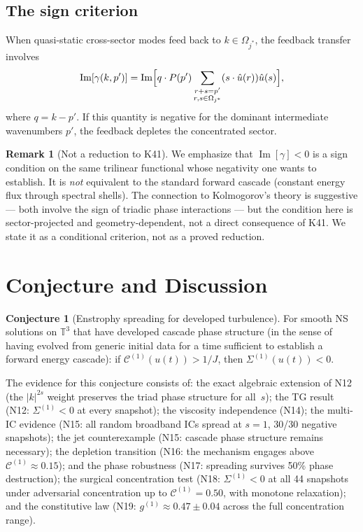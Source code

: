 \documentclass[11pt]{article}
\theoremstyle{definition}
\newtheorem{remark}[theorem]{Remark}
\newtheorem{conjecture}[theorem]{Conjecture}
\newcommand{\T}{\mathbb{T}}
\newcommand{\cC}{\mathcal{C}}
\DeclareMathOperator{\im}{Im}
\begin{document}
\subsection{The sign criterion}

When quasi-static cross-sector modes feed back to
$k\in\Omega_{j^*}$, the feedback transfer involves
\begin{equation}
\im[\gamma(k,p')] = \im\Bigl[q\cdot P(p')
\sum_{\substack{r+s=p'\\r,s\in\Omega_{j^*}}}
(s\cdot\hat u(r))\hat u(s)\Bigr],
\end{equation}
where $q=k-p'$.  If this quantity is negative for
the dominant intermediate wavenumbers $p'$, the feedback
depletes the concentrated sector.

\begin{remark}[Not a reduction to K41]
We emphasize that $\im[\gamma]<0$ is a sign condition
on the same trilinear functional whose negativity
one wants to establish.  It is \emph{not} equivalent
to the standard forward cascade (constant energy flux
through spectral shells).  The connection to Kolmogorov's
theory is suggestive --- both involve the sign of
triadic phase interactions --- but the condition here is
sector-projected and geometry-dependent, not a direct
consequence of K41.  We state it as a conditional
criterion, not as a proved reduction.
\end{remark}

\section{Conjecture and Discussion}
\label{sec:conjecture}

\begin{conjecture}[Enstrophy spreading for developed
turbulence]
\label{conj:enstrophy}
For smooth NS solutions on $\T^3$ that have developed
cascade phase structure (in the sense of having evolved
from generic initial data for a time sufficient to
establish a forward energy cascade): if
$\cC^{(1)}(u(t))>1/J$, then $\Sigma^{(1)}(u(t))<0$.
\end{conjecture}

The evidence for this conjecture consists of:
the exact algebraic extension of N12 (the
$|k|^{2s}$ weight preserves the triad phase
structure for all~$s$);
the TG result (N12: $\Sigma^{(1)}<0$ at every
snapshot);
the viscosity independence (N14);
the multi-IC evidence (N15: all random broadband
ICs spread at $s=1$, 30/30 negative snapshots);
the jet counterexample (N15: cascade phase structure
remains necessary);
the depletion transition (N16: the mechanism engages
above $\cC^{(1)}\approx 0.15$);
and the phase robustness (N17: spreading survives
50\% phase destruction);
the surgical concentration test (N18: $\Sigma^{(1)}<0$
at all 44 snapshots under adversarial concentration up
to $\cC^{(1)}=0.50$, with monotone relaxation);
and the constitutive law (N19: $g^{(1)}\approx
0.47\pm 0.04$ across the full concentration range).
\end{document}
